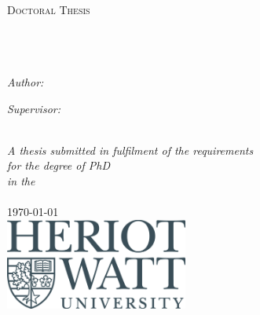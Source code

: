 \begin{titlepage}

    \begin{center}
    
        \textsc{\LARGE \univname}\\[1.5cm] %
        \textsc{\Large Doctoral Thesis}\\[0.5cm] %
        
        \HRule \\[0.4cm] %
        {\huge \bfseries \ttitle}\\[0.4cm] %
        \HRule \\[1.5cm] %
        
        \begin{minipage}{0.4\textwidth}
        \begin{flushleft} \large
        \emph{Author:}\\
        \href{http://www.johnsmith.com}{\authornames} %
        \end{flushleft}
        \end{minipage}
        \begin{minipage}{0.4\textwidth}
        \begin{flushright} \large
        \emph{Supervisor:} \\
        \href{http://www.jamessmith.com}{\supname} %
        \end{flushright}
        \end{minipage}\\[3cm]
        
        \large \textit{A thesis submitted in fulfilment of the requirements\\ for the degree of PhD}\\[0.3cm] %
        \textit{in the}\\[0.4cm]
        
        \deptname\\[2cm] %
        
        {\large \today}\\[1cm] %
        \includegraphics[width=6cm]{./Figures/HWUlogo.jpg} %
        
        \vfill

    \end{center}
    
\end{titlepage}